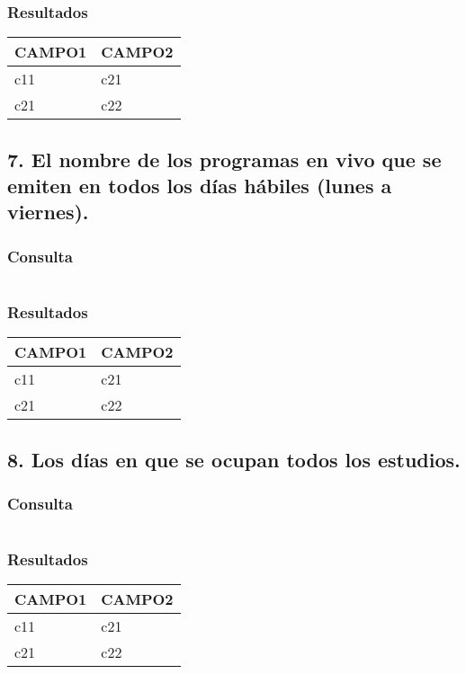 \subsubsection*{Resultados}
\begin{tabular}{|l|l|}
  \hline
    \bf{CAMPO1} & \bf{CAMPO2} \\ 
  \hline
    c11 & c21 \\ 
    c21 & c22 \\
  \hline
\end{tabular} 

\subsection*{7. \normalsize{El nombre de los programas en vivo que se emiten en todos los d\'ias h\'abiles (lunes a viernes).}}

\subsubsection*{Consulta}
\begin{lstlisting} 

\end{lstlisting}

\subsubsection*{Resultados}
\begin{tabular}{|l|l|}
  \hline
    \bf{CAMPO1} & \bf{CAMPO2} \\ 
  \hline
    c11 & c21 \\ 
    c21 & c22 \\
  \hline
\end{tabular} 

\subsection*{8. \normalsize{Los d\'ias en que se ocupan todos los estudios.}}

\subsubsection*{Consulta}
\begin{lstlisting} 

\end{lstlisting}

\subsubsection*{Resultados}
\begin{tabular}{|l|l|}
  \hline
    \bf{CAMPO1} & \bf{CAMPO2} \\ 
  \hline
    c11 & c21 \\ 
    c21 & c22 \\
  \hline
\end{tabular} 

